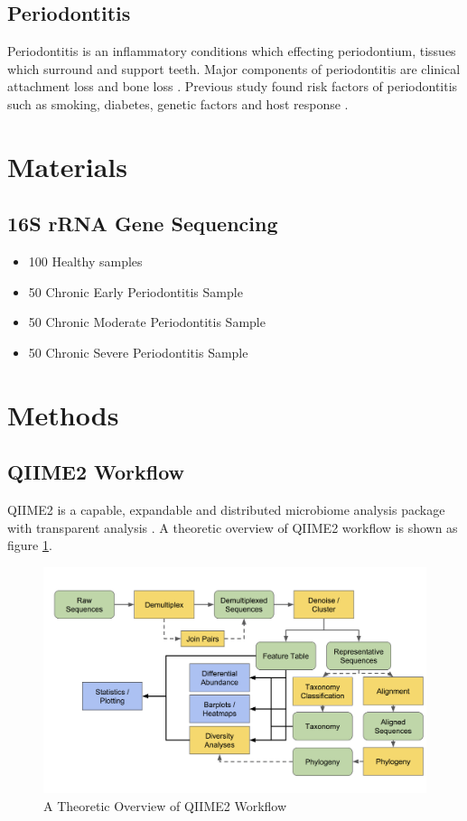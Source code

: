 \documentclass[a4paper]{article}
\begin{document}
        \subsection{Periodontitis}
            Periodontitis is an inflammatory conditions which effecting periodontium, tissues  which surround and support teeth. Major components of periodontitis are clinical attachment loss and bone loss \cite{periodontitis1}. Previous study found risk factors of periodontitis such as smoking, diabetes, genetic factors and host response \cite{periodontitis2}.

    \section{Materials}
        \subsection{16S rRNA Gene Sequencing}

            \begin{itemize}
                \item 100 Healthy samples
                \item 50 Chronic Early Periodontitis Sample
                \item 50 Chronic Moderate Periodontitis Sample
                \item 50 Chronic Severe Periodontitis Sample
            \end{itemize}

    \section{Methods}
        \subsection{QIIME2 Workflow}
            QIIME2 is a capable, expandable and distributed microbiome analysis package with transparent analysis \cite{qiime1, qiime2}. A theoretic overview of QIIME2 workflow is shown as figure \ref{fig:qiime-workflow}.

            \begin{figure}[p]
                \centering
                \includegraphics[width=0.8 \linewidth]{figures/qiime.png}
                \caption{A Theoretic Overview of QIIME2 Workflow \protect\cite{qiime1, qiime2}}
                \label{fig:qiime-workflow}
            \end{figure}
\end{document}

